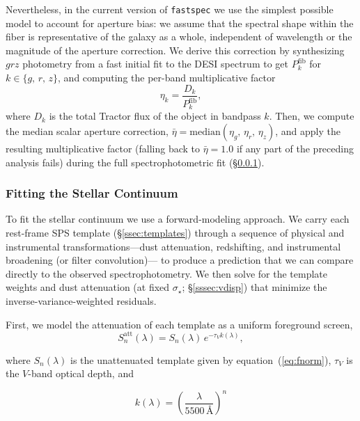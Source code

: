 \documentclass[modern,linenumbers]{aastex702}
\newcommand{\fastspec}{\texttt{fastspec}}
\newcommand{\vdisp}{\ensuremath{\sigma_\star}}
\newcommand{\tauv}{\ensuremath{\tau_V}}
\begin{document}
Nevertheless, in the current version of \fastspec{} we use the
simplest possible model to account for aperture bias: we assume that
the spectral shape within the fiber is representative of the galaxy as
a whole, independent of wavelength or the magnitude of the aperture
correction. We derive this correction by synthesizing $grz$ photometry
from a fast initial fit to the DESI spectrum to get $P_k^\mathrm{fib}$
for $k \in \{g,\,r,\,z\}$, and computing the per-band multiplicative
factor
\begin{equation}
  \eta_k = \frac{D_k}{P_k^\mathrm{fib}},
  \label{eq:apercorr}
\end{equation}
where $D_k$ is the total Tractor flux of the object in bandpass
$k$. Then, we compute the median scalar aperture correction,
$\bar{\eta}=\mathrm{median}(\eta_g,\,\eta_r,\,\eta_z)$, and apply the
resulting multiplicative factor (falling back to $\bar{\eta}=1.0$ if
any part of the preceding analysis fails) during the full
spectrophotometric fit (\S\ref{sssec:fitting}).

\subsubsection{Fitting the Stellar Continuum}
\label{sssec:fitting}

To fit the stellar continuum we use a forward-modeling approach.  We
carry each rest-frame SPS template (\S\ref{ssec:templates}) through a
sequence of physical and instrumental transformations---dust
attenuation, redshifting, and instrumental broadening (or filter
convolution)--- to
  produce a prediction that we can compare directly to the observed
  spectrophotometry. We then solve for the template weights and dust
attenuation (at fixed \vdisp; \S\ref{sssec:vdisp}) that minimize the
inverse-variance-weighted residuals.

First, we model the attenuation of each template as a
uniform foreground screen,
\begin{equation}
  S_n^\mathrm{att}(\lambda) = S_n(\lambda)\,e^{-\tauv k(\lambda)},
  \label{eq:atten}
\end{equation}

\noindent where $S_n(\lambda)$ is the unattenuated template given by
equation~(\ref{eq:fnorm}), $\tauv$ is the $V$-band optical depth, and

\begin{equation}
  k(\lambda) =
  \left(\frac{\lambda}{5500\,\text{\AA}}\right)^{n}
  \label{eq:kl}
\end{equation}
\end{document}

